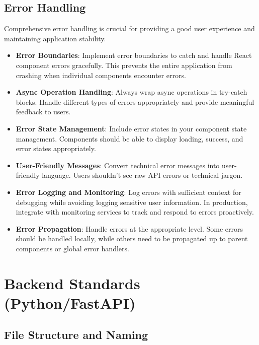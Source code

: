 \documentclass[12pt]{article}
\begin{document}
\subsection{Error Handling}
Comprehensive error handling is crucial for providing a good user experience and maintaining application stability.

\begin{itemize}
    \item \textbf{Error Boundaries}: Implement error boundaries to catch and handle React component errors gracefully. This prevents the entire application from crashing when individual components encounter errors.
    
    \item \textbf{Async Operation Handling}: Always wrap async operations in try-catch blocks. Handle different types of errors appropriately and provide meaningful feedback to users.
    
    \item \textbf{Error State Management}: Include error states in your component state management. Components should be able to display loading, success, and error states appropriately.
    
    \item \textbf{User-Friendly Messages}: Convert technical error messages into user-friendly language. Users shouldn't see raw API errors or technical jargon.
    
    \item \textbf{Error Logging and Monitoring}: Log errors with sufficient context for debugging while avoiding logging sensitive user information. In production, integrate with monitoring services to track and respond to errors proactively.
    
    \item \textbf{Error Propagation}: Handle errors at the appropriate level. Some errors should be handled locally, while others need to be propagated up to parent components or global error handlers.
\end{itemize}

\section{Backend Standards (Python/FastAPI)}

\subsection{File Structure and Naming}
\end{document}
